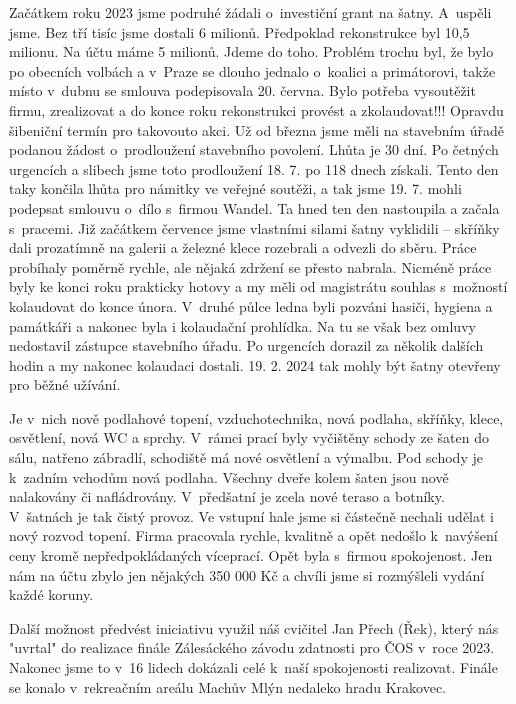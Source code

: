 \documentclass[11pt]{article}
\begin{document}
Začátkem roku 2023 jsme podruhé žádali o~investiční grant na šatny. A~uspěli jsme. Bez tří tisíc jsme dostali 6 milionů. Předpoklad rekonstrukce byl 10,5 milionu. Na účtu máme 5 milionů. Jdeme do toho. Problém trochu byl, že bylo po obecních volbách a v~Praze se dlouho jednalo o~koalici a primátorovi, takže místo v~dubnu se smlouva podepisovala 20. června. Bylo potřeba vysoutěžit firmu, zrealizovat a do konce roku rekonstrukci provést a zkolaudovat!!! Opravdu šibeniční termín pro takovouto akci. Už od března jsme měli na stavebním úřadě podanou žádost o~prodloužení stavebního povolení. Lhůta je 30 dní. Po četných urgencích a slibech jsme toto prodloužení 18. 7. po 118 dnech získali. Tento den taky končila lhůta pro námitky ve veřejné soutěži, a tak jsme 19. 7. mohli podepsat smlouvu o~dílo s~firmou Wandel. Ta hned ten den nastoupila a začala s~pracemi. Již začátkem července jsme vlastními silami šatny vyklidili – skříňky dali prozatímně na galerii a železné klece rozebrali a odvezli do sběru. Práce probíhaly poměrně rychle, ale nějaká zdržení se přesto nabrala. Nicméně práce byly ke konci roku prakticky hotovy a my měli od magistrátu souhlas s~možností kolaudovat do konce února. V~druhé půlce ledna byli pozváni hasiči, hygiena a památkáři a nakonec byla i kolaudační prohlídka. Na tu se však bez omluvy nedostavil zástupce stavebního úřadu. Po urgencích dorazil za několik dalších hodin a my nakonec kolaudaci dostali. 19. 2. 2024 tak mohly být šatny otevřeny pro běžné užívání. 

Je v~nich nově podlahové topení, vzduchotechnika, nová podlaha, skříňky, klece, osvětlení, nová WC a sprchy. V~rámci prací byly vyčištěny schody ze šaten do sálu, natřeno zábradlí, schodiště má nové osvětlení a výmalbu. Pod schody je k~zadním vchodům nová podlaha. Všechny dveře kolem šaten jsou nově nalakovány či nafládrovány. V~předšatní je zcela nové teraso a botníky. V~šatnách je tak čistý provoz. Ve vstupní hale jsme si částečně nechali udělat i nový rozvod topení. Firma pracovala rychle, kvalitně a opět nedošlo k~navýšení ceny kromě nepředpokládaných víceprací. Opět byla s~firmou spokojenost.
Jen nám na účtu zbylo jen nějakých 350 000 Kč a chvíli jsme si rozmýšleli vydání každé koruny.

Další možnost předvést iniciativu využil náš cvičitel Jan Přech (Řek), který nás "uvrtal" do realizace finále Zálesáckého závodu zdatnosti pro ČOS v~roce 2023. Nakonec jsme to v~16 lidech dokázali celé k~naší spokojenosti realizovat. Finále se konalo v~rekreačním areálu Machův Mlýn nedaleko hradu Krakovec.
\end{document}
